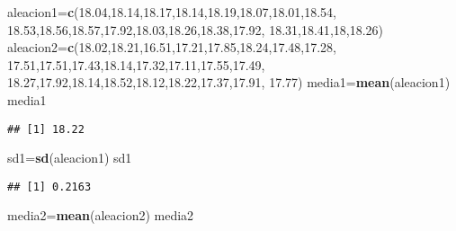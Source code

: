 \documentclass[
]{article}
\newenvironment{Shaded}{\begin{snugshade}}{\end{snugshade}}
\newcommand{\DecValTok}[1]{\textcolor[rgb]{0.00,0.00,0.81}{#1}}
\newcommand{\FloatTok}[1]{\textcolor[rgb]{0.00,0.00,0.81}{#1}}
\newcommand{\KeywordTok}[1]{\textcolor[rgb]{0.13,0.29,0.53}{\textbf{#1}}}
\newcommand{\NormalTok}[1]{#1}
\begin{document}
\begin{Shaded}
\begin{Highlighting}[]
\NormalTok{aleacion1=}\KeywordTok{c}\NormalTok{(}\FloatTok{18.04}\NormalTok{,}\FloatTok{18.14}\NormalTok{,}\FloatTok{18.17}\NormalTok{,}\FloatTok{18.14}\NormalTok{,}\FloatTok{18.19}\NormalTok{,}\FloatTok{18.07}\NormalTok{,}\FloatTok{18.01}\NormalTok{,}\FloatTok{18.54}\NormalTok{,}
            \FloatTok{18.53}\NormalTok{,}\FloatTok{18.56}\NormalTok{,}\FloatTok{18.57}\NormalTok{,}\FloatTok{17.92}\NormalTok{,}\FloatTok{18.03}\NormalTok{,}\FloatTok{18.26}\NormalTok{,}\FloatTok{18.38}\NormalTok{,}\FloatTok{17.92}\NormalTok{,}
            \FloatTok{18.31}\NormalTok{,}\FloatTok{18.41}\NormalTok{,}\DecValTok{18}\NormalTok{,}\FloatTok{18.26}\NormalTok{)}
\NormalTok{aleacion2=}\KeywordTok{c}\NormalTok{(}\FloatTok{18.02}\NormalTok{,}\FloatTok{18.21}\NormalTok{,}\FloatTok{16.51}\NormalTok{,}\FloatTok{17.21}\NormalTok{,}\FloatTok{17.85}\NormalTok{,}\FloatTok{18.24}\NormalTok{,}\FloatTok{17.48}\NormalTok{,}\FloatTok{17.28}\NormalTok{,}
            \FloatTok{17.51}\NormalTok{,}\FloatTok{17.51}\NormalTok{,}\FloatTok{17.43}\NormalTok{,}\FloatTok{18.14}\NormalTok{,}\FloatTok{17.32}\NormalTok{,}\FloatTok{17.11}\NormalTok{,}\FloatTok{17.55}\NormalTok{,}\FloatTok{17.49}\NormalTok{,}
            \FloatTok{18.27}\NormalTok{,}\FloatTok{17.92}\NormalTok{,}\FloatTok{18.14}\NormalTok{,}\FloatTok{18.52}\NormalTok{,}\FloatTok{18.12}\NormalTok{,}\FloatTok{18.22}\NormalTok{,}\FloatTok{17.37}\NormalTok{,}\FloatTok{17.91}\NormalTok{,}
            \FloatTok{17.77}\NormalTok{)}
\NormalTok{media1=}\KeywordTok{mean}\NormalTok{(aleacion1)}
\NormalTok{media1}
\end{Highlighting}
\end{Shaded}

\begin{verbatim}
## [1] 18.22
\end{verbatim}

\begin{Shaded}
\begin{Highlighting}[]
\NormalTok{sd1=}\KeywordTok{sd}\NormalTok{(aleacion1)}
\NormalTok{sd1}
\end{Highlighting}
\end{Shaded}

\begin{verbatim}
## [1] 0.2163
\end{verbatim}

\begin{Shaded}
\begin{Highlighting}[]
\NormalTok{media2=}\KeywordTok{mean}\NormalTok{(aleacion2)}
\NormalTok{media2}
\end{Highlighting}
\end{Shaded}
\end{document}
